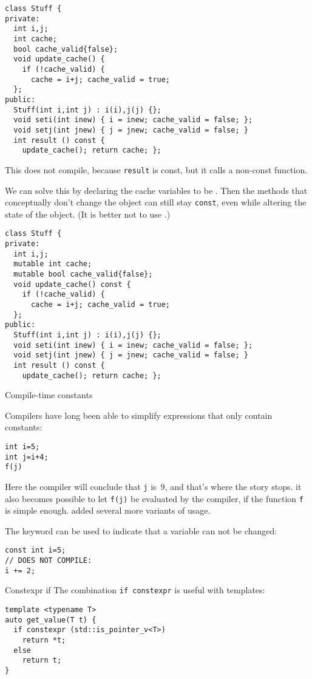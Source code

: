 \begin{lstlisting}
class Stuff {
private:
  int i,j;
  int cache;
  bool cache_valid{false};
  void update_cache() {
    if (!cache_valid) {
      cache = i+j; cache_valid = true;
  };
public:
  Stuff(int i,int j) : i(i),j(j) {};
  void seti(int inew) { i = inew; cache_valid = false; };
  void setj(int jnew) { j = jnew; cache_valid = false; }
  int result () const {
    update_cache(); return cache; };
\end{lstlisting}
This does not compile, because \lstinline{result} is const, but it
calls a non-const function.

We can solve this by
declaring the cache variables to be .
Then the methods that conceptually don't change the object
can still stay \lstinline{const}, even while altering the state of the
object.
%
(It is better not to use .)

\begin{lstlisting}
class Stuff {
private:
  int i,j;
  mutable int cache;
  mutable bool cache_valid{false};
  void update_cache() const {
    if (!cache_valid) {
      cache = i+j; cache_valid = true;
  };
public:
  Stuff(int i,int j) : i(i),j(j) {};
  void seti(int inew) { i = inew; cache_valid = false; };
  void setj(int jnew) { j = jnew; cache_valid = false; }
  int result () const {
    update_cache(); return cache; };
\end{lstlisting}


 {Compile-time constants}

Compilers have long been able to simplify expressions that only
contain constants:
\begin{lstlisting}
int i=5;
int j=i+4;
f(j)
\end{lstlisting}
Here the compiler will conclude that \lstinline{j} is~9, and that's
where the story stops. it also
becomes possible to let \lstinline{f(j)} be evaluated by the compiler,
if the function \lstinline{f} is simple enough.
 added several more variants of
 usage.

The  keyword can be used to indicate that a
variable can not be changed:
\begin{lstlisting}
const int i=5;
// DOES NOT COMPILE:
i += 2;
\end{lstlisting}

\begin{block}{Constexpr if}
  \label{sl:constexpr-if}
  The combination \lstinline{if constexpr} is useful with templates:
\begin{lstlisting}
template <typename T>
auto get_value(T t) {
  if constexpr (std::is_pointer_v<T>)
    return *t;
  else
    return t;
}
\end{lstlisting}
\end{block}

